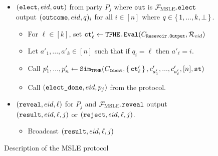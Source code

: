 \begin{figure}
{\begin{minipage}{1\textwidth}
\begin{itemize}
				\item $(\texttt{elect}, {eid}, \texttt{out})$ from party $P_j$ where $\texttt{out}$ is $\mathcal{F}_{\text{MSLE}}.\texttt{elect}$ output $(\texttt{outcome}, {eid}, q)_i$ for all $i \in [n]$ where $q \in \set{1, ..., k, \bot}$.

				      \begin{itemize}
					      \item For $\ell \in [k]$, set $\texttt{ct}'_\ell \gets \texttt{TFHE.Eval}(C_{\texttt{Resevoir.Output}}, \mathcal{R}_{eid})$
					      \item Let $a'_1, ..., a'_k \in [n]$ such that if $q_i = \ell$ then $a'_\ell = i$.
					      \item Call $p'_1, ..., p'_{n} \gets \texttt{Sim}_{{\texttt{TFHE}}}(C_\texttt{Ident}, \set{\texttt{ct}'_\ell}, c'_{a'_1}, ..., c'_{a'_\ell}, [n], \texttt{st})$
					      \item Call $(\texttt{elect\_done}, {eid}, p_j)$ from the protocol.
				      \end{itemize}
				\item $(\texttt{reveal}, {eid}, \ell)$ for $P_j$ and $\mathcal{F}_{\text{MSLE}}.\texttt{reveal}$ output $(\texttt{result}, {eid}, \ell, j)$ or $(\texttt{reject}, {eid}, \ell, j)$.
				      \begin{itemize}
					      \item Broadcast $(\texttt{result}, {eid}, \ell, j)$
				      \end{itemize}
			\end{itemize}
		\end{minipage}
	}
	\caption{Description of the MSLE protocol}
	\label{fig:simMSLE}
\end{figure}



